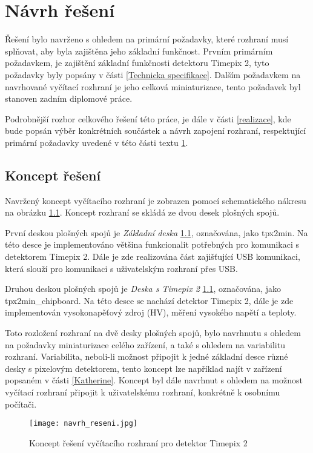 \chapter{Návrh řešení} %
\label{Koncept reseni}
Řešení bylo navrženo s ohledem na primární požadavky, které rozhraní musí splňovat, aby byla zajištěna jeho základní funkčnost. Prvním primárním požadavkem, je zajištění základní funkčnosti detektoru Timepix 2, tyto požadavky byly popsány v části \ref{Technicka specifikace}. Dalším požadavkem na navrhované vyčítací rozhraní je jeho celková miniaturizace, tento požadavek byl stanoven zadním diplomové práce.
\par Podrobnější rozbor celkového řešení této práce, je dále v části \ref{realizace}, kde bude popsán výběr konkrétních součástek a návrh zapojení rozhraní, respektující primární požadavky uvedené v této části textu \ref{Koncept reseni}.

\section{Koncept řešení}
Navržený koncept vyčítacího rozhraní je zobrazen pomocí schematického nákresu na obrázku \ref{fig:navrh_reseni}. Koncept rozhraní se skládá ze dvou desek plošných spojů. 
\par První deskou plošných spojů je \textit{Základní deska} \ref{fig:navrh_reseni}, označována, jako tpx2min. Na této desce je implementováno většina funkcionalit potřebných pro komunikaci s detektorem Timepix 2. Dále je zde realizována část zajišťující USB komunikaci, která slouží pro komunikaci s uživatelským rozhraní přes USB.
\par Druhou deskou plošných spojů je \textit{Deska s Timepix 2} \ref{fig:navrh_reseni}, označována, jako tpx2min\_chipboard. Na této desce se nachází detektor Timepix 2, dále je zde implementován vysokonapěťový zdroj (HV), měření vysokého napětí a teploty.
\par Toto rozložení rozhraní na dvě desky plošných spojů, bylo navrhnutu s ohledem na požadavky miniaturizace celého zařízení, a také s ohledem na variabilitu rozhraní. Variabilita, neboli-li možnost připojit k jedné základní desce různé desky s pixelovým detektorem, tento koncept lze například najít v zařízení popsaném v části \ref{Katherine}. Koncept byl dále navrhnut s ohledem na možnost vyčítací rozhraní připojit k uživatelskému rozhraní, konkrétně k osobnímu počítači.  
\begin{figure}[h!]
	\centering
	\captionsetup{justification=centering}
	\texttt{[image: navrh\_reseni.jpg]}
	\caption{Koncept řešení vyčítacího rozhraní pro detektor Timepix 2} 
	\label{fig:navrh_reseni}
\end{figure}

